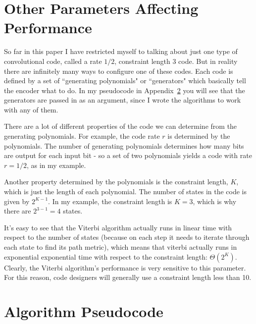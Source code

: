 \documentclass[11pt]{article}
\begin{document}
    \section{Other Parameters Affecting Performance}
        So far in this paper I have restricted myself to talking about just one
        type of convolutional code, called a rate $1/2$, constraint length 3 code.
        But in reality there are infinitely many ways to configure one of these
        codes.  Each code is defined by a set of ``generating polynomials" or ``generators" which
        basically tell the encoder what to do.  In my pseudocode in Appendix~\ref{app:pseudocode}
        you will see that the generators are passed in as an argument, since I wrote the algorithms
        to work with any of them.

        There are a lot of different properties of the code we can determine from the generating
        polynomials. For example, the code rate $r$ is determined by the
        polynomials.  The number of generating polynomials determines how many
        bits are output for each input bit - so a set of two polynomials yields
        a code with rate $r=1/2$, as in my example.
        
        Another property determined by the polynomials is the constraint
        length, $K$, which is just the length of each polynomial.  The number of
        states in the code is given by $2^{K-1}$.  In my example, the constraint
        length is $K=3$, which is why there are $2^{3-1} = 4$ states.

        It's easy to see that the Viterbi algorithm actually runs in linear time
        with respect to the number of states (because on each step it needs
        to iterate through each state to find its path metric), which means that
        viterbi actually runs in
        exponential exponential time with respect to the constraint length:
        $\Theta(2^K)$.  Clearly, the Viterbi algorithm's performance is very
        sensitive to this parameter.  For this reason, code designers will
        generally use a constraint length
        less than 10.

    \newpage
    \appendix
    \section{Algorithm Pseudocode}
        \label{app:pseudocode}
\end{document}
